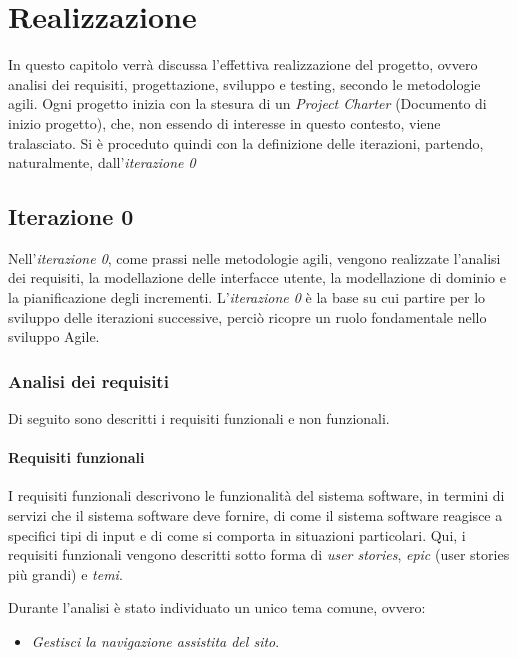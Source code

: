 
\chapter{Realizzazione}
\label{ref:realizzazione}

In questo capitolo verrà discussa l'effettiva realizzazione del progetto, ovvero analisi dei requisiti, progettazione, sviluppo e testing, secondo le metodologie agili.
Ogni progetto inizia con la stesura di un \textit{Project Charter} (Documento di inizio progetto), che, non essendo di interesse in questo contesto, viene tralasciato.
Si è proceduto quindi con la definizione delle iterazioni, partendo, naturalmente, dall'\textit{iterazione 0}

\section{Iterazione 0}

Nell'\emph{iterazione 0}, come prassi nelle metodologie agili, vengono realizzate l'analisi dei requisiti, la modellazione delle interfacce utente, la modellazione di dominio e la pianificazione degli incrementi.
L'\emph{iterazione 0} è la base su cui partire per lo sviluppo delle iterazioni successive, perciò ricopre un ruolo fondamentale nello sviluppo Agile.

\subsection{Analisi dei requisiti}
Di seguito sono descritti i requisiti funzionali e non funzionali.

\subsubsection{Requisiti funzionali}
I requisiti funzionali descrivono le funzionalità del sistema software, in termini di servizi che il sistema software deve fornire, di come il sistema software reagisce a specifici tipi di input e di come si comporta in situazioni particolari.
Qui, i requisiti funzionali vengono descritti sotto forma di \textit{user stories}, \textit{epic} (user stories più grandi) e \textit{temi}.

Durante l'analisi è stato individuato un unico tema comune, ovvero:
\begin{itemize}
\item \textit{Gestisci la navigazione assistita del sito}.
\end{itemize}

